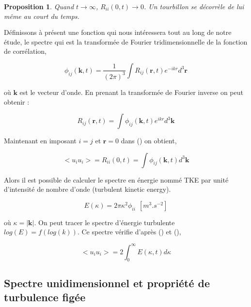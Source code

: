 \documentclass[12pt]{article}
\theoremstyle{plain}
\newtheorem{proposition}[theorem]{Proposition}
\theoremstyle{remark}
\begin{document}
		\begin{proposition}
			Quand $t\rightarrow\infty$, $R_{ii}(0,t)\rightarrow0$. Un tourbillon se décorrèle de lui même au court du temps.
		\end{proposition}
	
		Définissons à présent une fonction qui nous intéressera tout au long de notre étude, le spectre qui est la transformée de Fourier tridimensionnelle de la fonction de corrélation,
		
		\begin{equation}
			\phi_{ij}(\textbf{k}, t) = \frac{1}{(2\pi)^3}\int R_{ij}(\textbf{r},t)e^{-ikr}d^3\textbf{r}
		\end{equation}
	 
	
		où $\textbf{k}$ est le vecteur d'onde. En prenant la transformée de Fourier inverse on peut obtenir :
		
		\begin{equation}
			R_{ij}(\textbf{r}, t) = \int \phi_{ij}(\textbf{k},t)e^{ikr}d^3\textbf{k}
			\label{spectra_space}
		\end{equation}
		
		Maintenant en imposant $i=j$ et $\textbf{r}=0$ dans () on obtient, 
		
		\begin{equation}
			<u_iu_i>=R_{ii}(0,t)=\int \phi_{ij}(\textbf{k},t)d^3\textbf{k}
			\label{verif}
		\end{equation}
	
		Alors il est possible de calculer le spectre en énergie nommé TKE par unité d'intensité de nombre d'onde (turbulent kinetic energy). 
		
		\begin{equation}
			E(\kappa)=2\pi \kappa^2\phi_{ii}~~[m^{3}.s^{-2}]
			\label{energie_spectra}
		\end{equation}
	
		où $\kappa = |\textbf{k}|$. On peut tracer le spectre d'énergie turbulente $log(E)=f(log(k))$. Ce spectre vérifie d'après () et (),
		
		\begin{equation}
			<u_iu_i>=2\int_{0}^{\infty}E(\kappa,t)d\kappa
		\end{equation}
	
	\subsection{Spectre unidimensionnel et propriété de turbulence figée}
	
\end{document}
